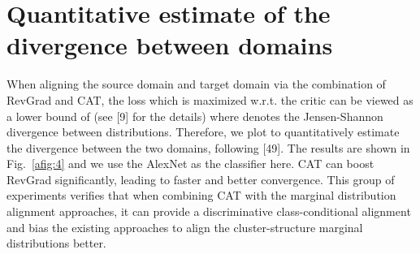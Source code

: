 \documentclass[10pt,twocolumn,letterpaper]{article}
\begin{document}
\section{Quantitative estimate of the divergence between domains}
When aligning the source domain and target domain via the combination of RevGrad and CAT, the loss  which is maximized w.r.t. the critic  can be viewed as a lower bound of  (see [9] for the details) where  denotes the Jensen-Shannon divergence between distributions. Therefore, we plot  to quantitatively estimate the divergence between the two domains, following [49]. The results are shown in Fig.~\ref{afig:4} and we use the AlexNet as the classifier here. CAT can boost RevGrad significantly, leading to faster and better convergence. This group of experiments verifies that when combining CAT with the marginal distribution alignment approaches, it can provide a discriminative class-conditional alignment and bias the existing approaches to align the cluster-structure marginal distributions better.
\end{document}

